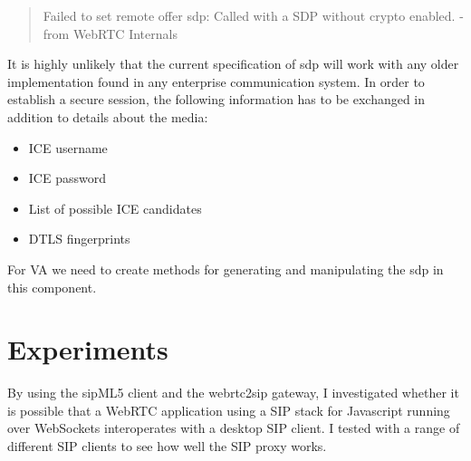 \begin{quote}
Failed to set remote offer sdp: Called with a SDP without crypto enabled. -from WebRTC Internals
\end{quote}

It is highly unlikely that the current specification of \gls{sdp} will work with any older implementation found in any enterprise communication system. In order to establish a secure session, the following information has to be exchanged in addition to details about the media:

\begin{itemize}
\item{ICE username}
\item{ICE password}
\item{List of possible ICE candidates}
\item{DTLS fingerprint}s
\end{itemize}

For VA we need to create methods for generating and manipulating the \gls{sdp} in this component.

\section{Experiments}
By using the sipML5 client and the webrtc2sip gateway, I investigated whether it is possible that a WebRTC application using a SIP stack for Javascript running over WebSockets interoperates with a desktop SIP client. I tested with a range of different SIP clients to see how well the SIP proxy works.

